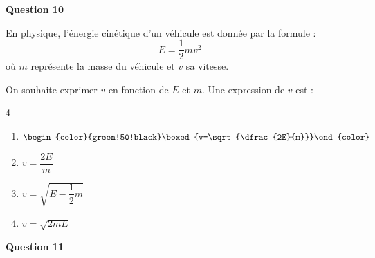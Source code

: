 \textbf{Question 10}
	
	En physique, l'énergie cinétique d'un véhicule est donnée par la formule :
	\[E=\dfrac{1}{2}m v^{2}\]
	où $m$ représente la masse du véhicule et $v$ sa vitesse.
	
	On souhaite exprimer $v$ en fonction de $E$ et $m$. Une expression de $v$ est :
	
\begin{multicols}{4}
\begin{enumerate}[label=\textbf{\alph* .}]
	\item $\begin{color}{green!50!black}\boxed{v=\sqrt{\dfrac{2E}{m}}}\end{color}$
	\item $v=\dfrac{2E}{m}$ 
	\item $v=\sqrt{E-\dfrac{1}{2}m}$ 
	\item $v=\sqrt{2mE}$ 
\end{enumerate}
\end{multicols}


		\textbf{Question 11}

